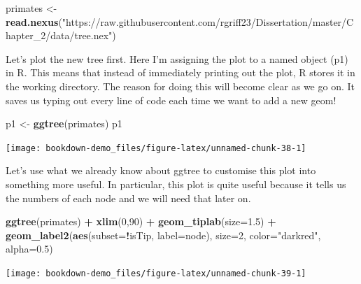 \documentclass[
]{book}
\newenvironment{Shaded}{\begin{snugshade}}{\end{snugshade}}
\newcommand{\DataTypeTok}[1]{\textcolor[rgb]{0.13,0.29,0.53}{#1}}
\newcommand{\DecValTok}[1]{\textcolor[rgb]{0.00,0.00,0.81}{#1}}
\newcommand{\FloatTok}[1]{\textcolor[rgb]{0.00,0.00,0.81}{#1}}
\newcommand{\KeywordTok}[1]{\textcolor[rgb]{0.13,0.29,0.53}{\textbf{#1}}}
\newcommand{\NormalTok}[1]{#1}
\newcommand{\OperatorTok}[1]{\textcolor[rgb]{0.81,0.36,0.00}{\textbf{#1}}}
\newcommand{\StringTok}[1]{\textcolor[rgb]{0.31,0.60,0.02}{#1}}
\begin{document}
\begin{Shaded}
\begin{Highlighting}[]
\NormalTok{primates \textless{}{-}}\StringTok{ }\KeywordTok{read.nexus}\NormalTok{(}\StringTok{"https://raw.githubusercontent.com/rgriff23/Dissertation/master/Chapter\_2/data/tree.nex"}\NormalTok{)}
\end{Highlighting}
\end{Shaded}

Let's plot the new tree first. Here I'm assigning the plot to a named object (p1) in R. This means that instead of immediately printing out the plot, R stores it in the working directory. The reason for doing this will become clear as we go on. It saves us typing out every line of code each time we want to add a new geom!

\begin{Shaded}
\begin{Highlighting}[]
\NormalTok{p1 \textless{}{-}}\StringTok{ }\KeywordTok{ggtree}\NormalTok{(primates)}
\NormalTok{p1}
\end{Highlighting}
\end{Shaded}

\begin{center}\texttt{[image: bookdown-demo\_files/figure-latex/unnamed-chunk-38-1]} \end{center}

Let's use what we already know about ggtree to customise this plot into something more useful. In particular, this plot is quite useful because it tells us the numbers of each node and we will need that later on.

\begin{Shaded}
\begin{Highlighting}[]
\KeywordTok{ggtree}\NormalTok{(primates) }\OperatorTok{+}
\StringTok{   }\KeywordTok{xlim}\NormalTok{(}\DecValTok{0}\NormalTok{,}\DecValTok{90}\NormalTok{) }\OperatorTok{+}\StringTok{ }
\StringTok{   }\KeywordTok{geom\_tiplab}\NormalTok{(}\DataTypeTok{size=}\FloatTok{1.5}\NormalTok{) }\OperatorTok{+}
\StringTok{   }\KeywordTok{geom\_label2}\NormalTok{(}\KeywordTok{aes}\NormalTok{(}\DataTypeTok{subset=}\OperatorTok{!}\NormalTok{isTip, }\DataTypeTok{label=}\NormalTok{node), }\DataTypeTok{size=}\DecValTok{2}\NormalTok{, }\DataTypeTok{color=}\StringTok{"darkred"}\NormalTok{, }\DataTypeTok{alpha=}\FloatTok{0.5}\NormalTok{)}
\end{Highlighting}
\end{Shaded}

\begin{center}\texttt{[image: bookdown-demo\_files/figure-latex/unnamed-chunk-39-1]} \end{center}
\end{document}
